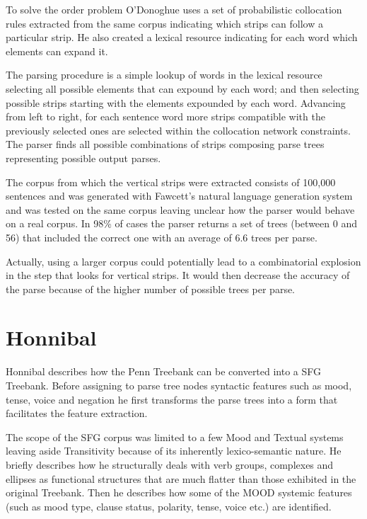     To solve the order problem O'Donoghue uses a set of probabilistic collocation rules extracted from the same corpus indicating which strips can follow a particular strip. He also created a lexical resource indicating for each word which elements can expand it.

    The parsing procedure is a simple lookup of words in the lexical resource selecting all possible elements that can expound by each word; and then selecting possible strips starting with the elements expounded by each word. Advancing from left to right, for each sentence word more strips compatible with the previously selected ones are selected within the collocation network constraints. The parser finds all possible combinations of strips composing parse trees representing possible output parses. 
    
    The corpus from which the vertical strips were extracted consists of 100,000 sentences and was generated with Fawcett's natural language generation system and was tested on the same corpus leaving unclear how the parser would behave on a real corpus. In 98\% of cases the parser returns a set of trees (between 0 and 56) that included the correct one with an average of 6.6 trees per parse. 
    
    Actually, using a larger corpus could potentially lead to a combinatorial explosion in the step that looks for vertical strips. It would then decrease the accuracy of the parse because of the higher number of possible trees per parse.

\section{Honnibal}
    Honnibal \citeyearpar{Honnibal2004a,Honnibal2007} describes how the Penn Treebank can be converted into a SFG Treebank. Before assigning to parse tree nodes syntactic features such as mood, tense, voice and negation he first transforms the parse trees into a form that facilitates the feature extraction. 

    The scope of the SFG corpus was limited to a few Mood and Textual systems leaving aside Transitivity because of its inherently lexico-semantic nature. He briefly describes how he structurally deals with verb groups, complexes and ellipses as functional structures that are much flatter than those exhibited in the original Treebank. Then he describes how some of the MOOD systemic features (such as mood type, clause status, polarity, tense, voice etc.) are identified.
    
